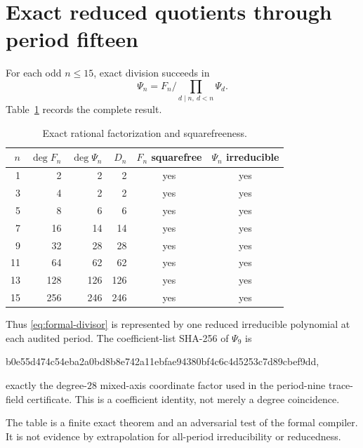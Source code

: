 \section{Exact reduced quotients through period fifteen}

For each odd $n\le15$, exact division succeeds in
\begin{equation}\label{eq:Psi}
\Psi_n=F_n\bigg/\prod_{d\mid n,\ d<n}\Psi_d.
\end{equation}
Table~\ref{tab:factor} records the complete result.

\begin{table}[ht]
\centering
\begin{tabular}{rrrrcc}
\toprule
$n$ & $\deg F_n$ & $\deg\Psi_n$ & $D_n$ & $F_n$ squarefree & $\Psi_n$ irreducible\\
\midrule
1  & 2   & 2   & 2   & yes & yes\\
3  & 4   & 2   & 2   & yes & yes\\
5  & 8   & 6   & 6   & yes & yes\\
7  & 16  & 14  & 14  & yes & yes\\
9  & 32  & 28  & 28  & yes & yes\\
11 & 64  & 62  & 62  & yes & yes\\
13 & 128 & 126 & 126 & yes & yes\\
15 & 256 & 246 & 246 & yes & yes\\
\bottomrule
\end{tabular}
\caption{Exact rational factorization and squarefreeness.}
\label{tab:factor}
\end{table}

Thus \eqref{eq:formal-divisor} is represented by one reduced irreducible
polynomial at each audited period.  The coefficient-list SHA-256 of
$\Psi_9$ is
\begin{center}
\ttfamily\small
b0e55d474c54eba2a0bd8b8e742a11ebfae94380bf4c6c4d5253c7d89cbef9dd,
\end{center}
exactly the degree-$28$ mixed-axis coordinate factor used in the period-nine
trace-field certificate.  This is a coefficient identity, not merely a
degree coincidence.

The table is a finite exact theorem and an adversarial test of the formal
compiler.  It is not evidence by extrapolation for all-period irreducibility
or reducedness.
